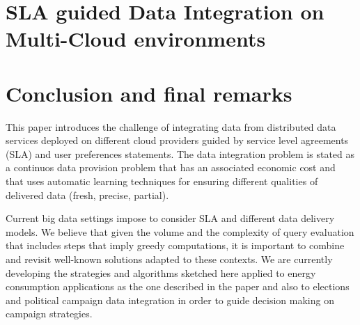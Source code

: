 \documentclass{llncs}
\begin{document}
%


 


 


\section{SLA guided Data Integration on Multi-Cloud environments}\label{sec:approach}




\section{Conclusion and final remarks}\label{sec:conc}
This paper introduces the challenge of integrating data from distributed data services deployed on different cloud providers guided by service level agreements (SLA) and user preferences statements. The data integration problem is stated as a continuos data provision problem that has an associated economic cost and that uses automatic learning techniques for ensuring different qualities of delivered data (fresh, precise, partial).

Current big data settings impose to consider SLA and different data delivery models. We believe that given the volume and the complexity of query evaluation that includes steps that imply greedy computations, it is important to combine and revisit well-known solutions adapted to these contexts. We are currently developing the strategies and algorithms sketched here applied to energy consumption applications as the one described in the paper and also to elections and political campaign data integration in order to guide decision making on campaign strategies.


\end{document}
